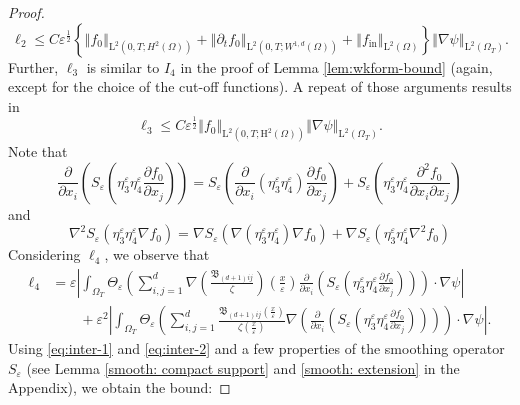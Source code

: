\documentclass[10pt,a4paper]{amsart}
\newcommand{\eps}{\varepsilon}
\newcommand{\xeps}{\left(\frac{x}{\varepsilon}\right)}
\begin{document}
\begin{proof}
\begin{equation}
\ell_2 \le C \eps^{\frac12}\left\{
\left\Vert f_0 \right\Vert_{\mathrm L^2(0,T;H^2(\Omega))}
+ \left\Vert \partial_t f_0 \right\Vert_{\mathrm L^2(0,T;W^{1,d}(\Omega))}
+ \left\Vert  f_{\text{in}} \right\Vert_{\mathrm L^2(\Omega)}
\right\} \left\Vert \nabla \psi \right\Vert_{\mathrm L^2(\Omega_T)}.
\end{equation}
Further, $\ell_3$ is similar to $I_4$ in the proof of Lemma \ref{lem:wkform-bound} (again, except for the choice of the cut-off functions). A repeat of those arguments results in
\begin{equation}\label{eq:bd-ell-3}
\ell_3 \le C \eps^{\frac12}
\left\Vert f_0\right\Vert_{\mathrm L^2(0,T;\mathrm H^2(\Omega))}
\left\Vert \nabla \psi \right\Vert_{\mathrm L^2(\Omega_T)}.
\end{equation}
Note that
\begin{equation}\label{eq:inter-1}
\frac{\partial}{\partial x_i} \left(S_\eps \left( \eta_3^\eps \eta_4^\eps \frac{\partial f_0}{\partial x_j}\right)\right)
= S_\eps \left( \frac{\partial}{\partial x_i}\left(\eta_3^\eps \eta_4^\eps\right) \frac{\partial f_0}{\partial x_j}\right)
+ S_\eps \left( \eta_3^\eps \eta_4^\eps \frac{\partial^2 f_0}{\partial x_i \partial x_j}\right)
\end{equation}
and
\begin{equation}\label{eq:inter-2}
\nabla^2 S_\eps\left(\eta_3^\eps \eta_4^\eps \nabla f_0\right) 
= \nabla S_\eps\left(\nabla\left(\eta^\eps_3 \eta^\eps_4\right) \nabla f_0\right) 
+ \nabla S_\eps\left(\eta^\eps_3 \eta^\eps_4 \nabla^2 f_0\right)
\end{equation}
Considering $\ell_4$, we observe that
\begin{equation*}
\begin{aligned}
\ell_4 & = \eps \left\vert \int_{\Omega_T} \Theta_\eps \left(\sum_{i,j=1}^d \nabla \left(\frac{\mathfrak{B}_{(d+1)ij}}{\zeta}\right)\xeps \frac{\partial}{\partial x_i} \left(S_\eps \left( \eta_3^\eps \eta_4^\eps \frac{\partial f_0}{\partial x_j}\right)\right)\right) \cdot \nabla \psi \right\vert
\\
& \qquad + \eps^2 \left\vert \int_{\Omega_T} \Theta_\eps \left(\sum_{i,j=1}^d \frac{\mathfrak{B}_{(d+1)ij}\xeps}{\zeta\xeps} \nabla \left( \frac{\partial}{\partial x_i} \left(S_\eps \left( \eta_3^\eps \eta_4^\eps \frac{\partial f_0}{\partial x_j}\right)\right)\right)\right) \cdot \nabla \psi \right\vert.
\end{aligned}
\end{equation*}
Using \eqref{eq:inter-1} and \eqref{eq:inter-2} and a few properties of the smoothing operator $S_\eps$ (see Lemma \ref{smooth: compact support} and \ref{smooth: extension} in the Appendix), we obtain the bound:

\end{proof}
\end{document}
